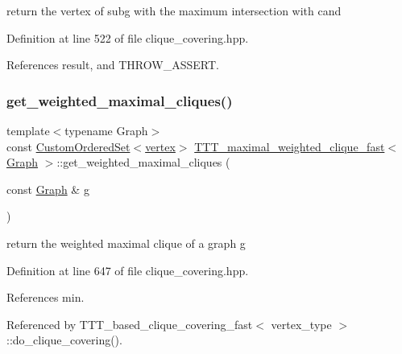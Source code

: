 return the vertex of subg with the maximum intersection with cand 



Definition at line 522 of file clique\+\_\+covering.\+hpp.



References result, and T\+H\+R\+O\+W\+\_\+\+A\+S\+S\+E\+RT.

\mbox{\label{classTTT__maximal__weighted__clique__fast_af875360ed6a8408976791c7d39adada9}} 
\subsubsection{\texorpdfstring{get\+\_\+weighted\+\_\+maximal\+\_\+cliques()}{get\_weighted\_maximal\_cliques()}}
{\footnotesize\ttfamily template$<$typename Graph$>$ \\
const \hyperlink{classCustomOrderedSet}{Custom\+Ordered\+Set}$<$\hyperlink{classTTT__maximal__weighted__clique__fast_a55ca1f8931415f7338827925b86c218d}{vertex}$>$ \hyperlink{classTTT__maximal__weighted__clique__fast}{T\+T\+T\+\_\+maximal\+\_\+weighted\+\_\+clique\+\_\+fast}$<$ \hyperlink{structGraph}{Graph} $>$\+::get\+\_\+weighted\+\_\+maximal\+\_\+cliques (\begin{DoxyParamCaption}\item[{const \hyperlink{structGraph}{Graph} \&}]{g }\end{DoxyParamCaption})\hspace{0.3cm}{\ttfamily [inline]}}



return the weighted maximal clique of a graph g 



Definition at line 647 of file clique\+\_\+covering.\+hpp.



References min.



Referenced by T\+T\+T\+\_\+based\+\_\+clique\+\_\+covering\+\_\+fast$<$ vertex\+\_\+type $>$\+::do\+\_\+clique\+\_\+covering().

